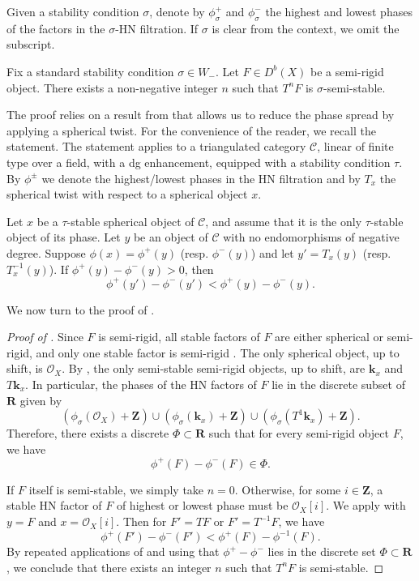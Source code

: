 \documentclass{amsart}
\begin{document}
Given a stability condition \(\sigma\), denote by \(\phi_{\sigma}^+\) and \(\phi_{\sigma}^{-}\) the highest and lowest phases of the factors in the \(\sigma\)-HN filtration.
If \(\sigma\) is clear from the context, we omit the subscript.
\begin{lemma}\label{lem:phasereduction}
  Fix a standard stability condition \(\sigma \in W_-\).
  Let \(F \in D^b(X)\) be a semi-rigid object.
  There exists a non-negative integer \(n\) such that \(T^nF\) is \(\sigma\)-semi-stable.
\end{lemma}
The proof relies on a result from \cite{bap.deo.lic:23} that allows us to reduce the phase spread by applying a spherical twist.
For the convenience of the reader, we recall the statement.
The statement applies to a triangulated category \(\mathcal{C}\), linear of finite type over a field, with a dg enhancement, equipped with a stability condition \(\tau\).
By \(\phi^{\pm}\) we denote the highest/lowest phases in the HN filtration and by \(T_{x}\) the spherical twist with respect to a spherical object \(x\).
\begin{theorem}
  \label{thm:algorithm}
  Let \(x\) be a \(\tau\)-stable spherical object of \(\mathcal{C}\), and assume that it is the only \(\tau\)-stable object of its phase.
  Let \(y\) be an object of \(\mathcal{C}\) with no endomorphisms of negative degree.
  Suppose \(\phi(x) = \phi^+(y)\) (resp. \(\phi^-(y)\)) and let \(y' = T_x(y)\) (resp. \(T^{-1}_x(y)\)).
  If \(\phi^+(y) - \phi^-(y) > 0\), then
  \[ \phi^+(y') - \phi^-(y') < \phi^+(y) - \phi^-(y).\]
\end{theorem}
We now turn to the proof of .
\begin{proof}[Proof of ]
  Since \(F\) is semi-rigid, all stable factors of \(F\) are either spherical or semi-rigid, and only one stable factor is semi-rigid \cite[Proposition~2.9]{huy.mac.ste:08}.
  The only spherical object, up to shift, is \(\mathcal{O}_X\).
  By , the only semi-stable semi-rigid objects, up to shift, are \(\mathbf{k}_x\) and \(T \mathbf{k}_x\).
  In particular, the phases of the HN factors of \(F\) lie in the discrete subset of \(\mathbf{R}\) given by \[\left(\phi_{\sigma}(\mathcal{O}_X) + \mathbf{Z} \right) \cup \left(\phi_{\sigma}(\mathbf{k}_x) + \mathbf{Z} \right) \cup \left(\phi_{\sigma}(T^{1}\mathbf{k}_x) + \mathbf{Z}\right).\]
  Therefore, there exists a discrete \(\Phi \subset \mathbf{R}\) such that for every semi-rigid object \(F\), we have \[\phi^+(F) - \phi^-(F) \in \Phi.\]

  If \(F\) itself is semi-stable, we simply take \(n = 0\).
  Otherwise, for some \(i \in \mathbf{Z}\), a stable HN factor of \(F\) of highest or lowest phase must be \(\mathcal{O}_X[i]\).
  We apply  with \(y = F\) and \(x = \mathcal{O}_X[i]\).
  Then for \(F' = T F\) or \(F' = T^{-1} F\), we have
  \[ \phi^+(F') - \phi^-(F') < \phi^{+}(F) - \phi^{-1}(F).\]
  By repeated applications of  and using that \(\phi^+ - \phi^-\) lies in the discrete set \(\Phi \subset \mathbf{R}\), we conclude that there exists an integer \(n\) such that \(T^nF\) is semi-stable.
\end{proof}
\end{document}

